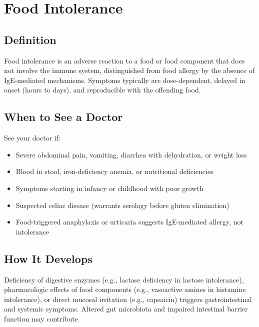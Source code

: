 \chapter{Food Intolerance}

\section*{Definition}
Food intolerance is an adverse reaction to a food or food component that does not involve the immune system, distinguished from food allergy by the absence of IgE-mediated mechanisms. Symptoms typically are dose-dependent, delayed in onset (hours to days), and reproducible with the offending food.

\section*{When to See a Doctor}
See your doctor if:
\begin{itemize}
  \item Severe abdominal pain, vomiting, diarrhea with dehydration, or weight loss
  \item Blood in stool, iron-deficiency anemia, or nutritional deficiencies
  \item Symptoms starting in infancy or childhood with poor growth
  \item Suspected celiac disease (warrants serology before gluten elimination)
  \item Food-triggered anaphylaxis or urticaria suggests IgE-mediated allergy, not intolerance
\end{itemize}

\section*{How It Develops}
Deficiency of digestive enzymes (e.g., lactase deficiency in lactose intolerance), pharmacologic effects of food components (e.g., vasoactive amines in histamine intolerance), or direct mucosal irritation (e.g., capsaicin) triggers gastrointestinal and systemic symptoms. Altered gut microbiota and impaired intestinal barrier function may contribute.

